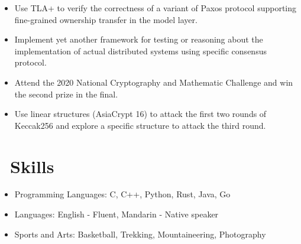 \documentclass{resume}
\begin{document}
\begin{itemize}
  \item Use TLA+ to verify the correctness of a variant of Paxos protocol supporting fine-grained ownership transfer in the model layer.
  \item Implement yet another framework for testing or reasoning about the implementation of actual distributed systems using specific consensus protocol.
\end{itemize}



\begin{itemize}
  \item Attend the 2020 National Cryptography and Mathematic Challenge and win the second prize in the final.
  \item Use linear structures (AsiaCrypt 16) to attack the first two rounds of Keccak256 and explore a specific structure to attack the third round.
\end{itemize}





\section{\faCogs\ Skills}
\begin{itemize}[parsep=0.5ex]
  \item Programming Languages: C, C++, Python, Rust, Java, Go
  \item Languages: English - Fluent, Mandarin - Native speaker
  \item Sports and Arts: Basketball, Trekking, Mountaineering, Photography
\end{itemize}



%
%
\end{document}
